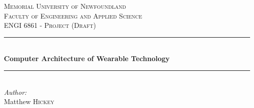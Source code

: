 \newcommand{\HRule}{\rule{\linewidth}{0.5mm}} %

\center %


\textsc{\LARGE Memorial University of Newfoundland}\\[1.5cm]
\textsc{\Large Faculty of Engineering and Applied Science}\\[0.5cm] %
\textsc{\large ENGI 6861 - Project (Draft)}\\[0.5cm] %


\HRule \\[0.4cm]
{ \huge \bfseries Computer Architecture of Wearable Technology}\\[0.4cm] %
\HRule \\[1.5cm]


\Large \emph{Author:}\\
Matthew \textsc{Hickey}\\[2cm] %


